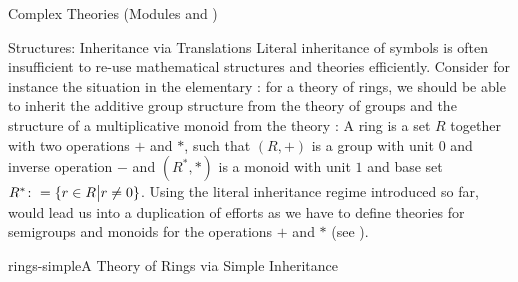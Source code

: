 \begin{tchapter}[id=complex-theories,short=Complex Theories]{Complex Theories (Modules
     and )}
\begin{tsection}[id=morphisms]{Structures: Inheritance via Translations}
  Literal inheritance of symbols is often insufficient to re-use mathematical structures
  and theories efficiently. Consider for instance the situation in the elementary
  : for a theory of rings, we should be able to inherit
  the additive group structure from the theory  of groups and the
  structure of a multiplicative monoid from the theory : A ring is a set
  $R$ together with two operations $+$ and $*$, such that $(R,+)$ is a group with unit $0$
  and inverse operation $-$ and $(R^*,*)$ is a monoid with unit $1$ and base set
  $R^*\colon=\{r\in R\bigl|r\ne 0\}$.  Using the literal inheritance regime introduced so
  far, would lead us into a duplication of efforts as we have to define theories for
  semigroups and monoids for the operations $+$ and $*$ (see ).
\begin{myfig}{rings-simple}{A Theory of Rings via Simple Inheritance}
\end{myfig}
\end{tsection}
\end{tchapter}
